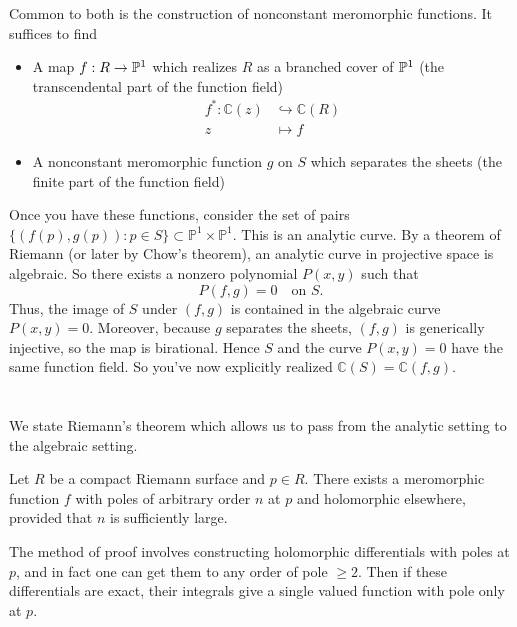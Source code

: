 \documentclass[12pt]{article}
\begin{document}
Common to both is the construction of nonconstant meromorphic functions. It suffices to find \begin{itemize}
    \item A map $f:R \to \P^1$ which realizes $R$ as a branched cover of $\P^1$ (the transcendental part of the function field) \begin{align*}
        f^*: \mathbb{C}(z) &\hookrightarrow \mathbb{C}(R) \\
        z &\mapsto f
    \end{align*}
    \item A nonconstant meromorphic function $g$ on $S$ which separates the sheets (the finite part of the function field)
\end{itemize}
Once you have these functions, consider the set of pairs $\{(f(p), g(p)) : p \in S\} \subset \mathbb{P}^1 \times \mathbb{P}^1$. This is an analytic curve. By a theorem of Riemann (or later by Chow's theorem), an analytic curve in projective space is algebraic. So there exists a nonzero polynomial $P(x,y)$ such that
\[
P(f,g) = 0 \quad \text{on } S.
\]
Thus, the image of $S$ under $(f,g)$ is contained in the algebraic curve $P(x,y)=0$. Moreover, because $g$ separates the sheets, $(f,g)$ is generically injective, so the map is birational. Hence $S$ and the curve $P(x,y)=0$ have the same function field. So you've now explicitly realized $\mathbb{C}(S) = \mathbb{C}(f,g)$.

\section{}
We state Riemann's theorem which allows us to pass from the analytic setting to the algebraic setting.
\begin{theorem}
    Let $R$ be a compact Riemann surface and $p\in R$. There exists a meromorphic function $f$ with poles of arbitrary order $n$ at $p$ and holomorphic elsewhere, provided that $n$ is sufficiently large.
\end{theorem}

The method of proof involves constructing holomorphic differentials with poles at $p$, and in fact one can get them to any order of pole $\geq 2$. Then if these differentials are exact, their integrals give a single valued function with pole only at $p$.
\end{document}
